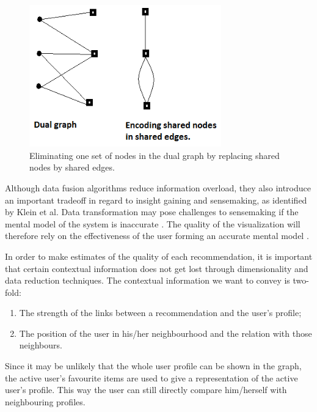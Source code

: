 \documentclass[a4paper,10pt,twocolumn]{article}
\begin{document}
\begin{figure}[!ht]
  \begin{center}
  	
    \includegraphics[width=8.3cm]{data/dual-graph2}
  \end{center}
  \caption{Eliminating one set of nodes in the dual graph by replacing shared nodes by shared edges.}
  \label{fig:dualgraph2}
\end{figure}

Although data fusion algorithms reduce information overload, they also introduce an important tradeoff in regard to insight gaining and sensemaking, as identified by Klein et al. Data transformation may pose challenges to sensemaking if the mental model of the system is inaccurate \cite{klein2006}. The quality of the visualization will therefore rely on the effectiveness of the user forming an accurate mental model \cite{herlocker2000, klein2006}.

In order to make estimates of the quality of each recommendation, it is important that certain contextual information does not get lost through dimensionality and data reduction techniques. The contextual information we want to convey is two-fold:

\begin{enumerate}
	\item The strength of the links between a recommendation and the user's profile;
	\item The position of the user in his/her neighbourhood and the relation with those neighbours.
\end{enumerate}

Since it may be unlikely that the whole user profile can be shown in the graph, the active user's favourite items are used to give a representation of the active user's profile. This way the user can still directly compare him/herself with neighbouring profiles.
\end{document}
